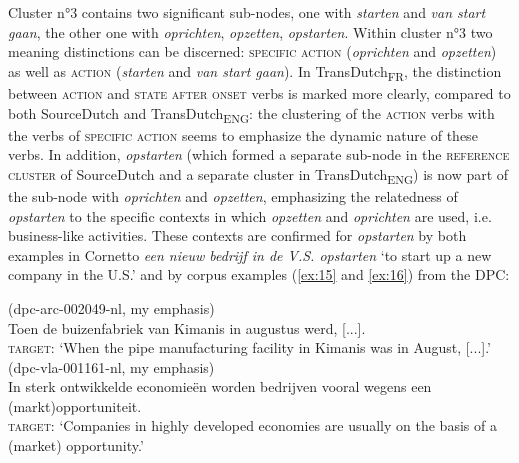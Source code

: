 Cluster n°3 contains two significant sub-nodes, one with \textit{starten} and \textit{van start gaan}, the other one with \textit{oprichten}, \textit{opzetten}, \textit{opstarten}. Within cluster n°3 two meaning distinctions can be discerned: {\textsc{specific}} \textsc{action} (\textit{oprichten} and \textit{opzetten}) as well as \textsc{action} (\textit{starten} and \textit{van start gaan}). In TransDutch\textsubscript{FR}, the distinction between \textsc{action} and \textsc{state after onset} verbs is marked more clearly, compared to both SourceDutch and TransDutch\textsubscript{ENG}: the clustering of the \textsc{action} verbs with the verbs of {\textsc{specific}} \textsc{action} seems to emphasize the dynamic nature of these verbs. In addition, \textit{opstarten} (which formed a separate sub-node in the \textsc{reference cluster} of SourceDutch and a separate cluster in TransDutch\textsubscript{ENG}) is now part of the sub-node with \textit{oprichten} and \textit{opzetten}, emphasizing the relatedness of \textit{opstarten} to the specific contexts in which \textit{opzetten} and \textit{oprichten} are used, i.e. business-like activities. These contexts are confirmed for \textit{opstarten} by both examples in Cornetto \textit{een nieuw bedrijf in de V.S. opstarten} `to start up a new company in the U.S.' and by corpus examples (\ref{ex:15} and \ref{ex:16}) from the DPC:

\ea(dpc-arc-002049-nl, my emphasis)\label{ex:15}\\
Toen de buizenfabriek van Kimanis in augustus  werd, [...].\smallskip\\\relax
\textsc{target:} `When the pipe manufacturing facility in Kimanis was  in August, [...].'
\ex(dpc-vla-001161-nl, my emphasis)\label{ex:16}\\
In sterk ontwikkelde economieën worden bedrijven vooral  wegens een (markt)opportuniteit.\smallskip\\\relax
\textsc{target:} `Companies in highly developed economies are usually  on the basis of a (market) opportunity.' 
\z

